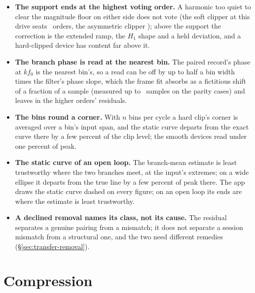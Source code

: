 \documentclass[11pt,a4paper]{article}
\begin{document}
{\begin{itemize}
  strips it, leaving levels of $\pm(a+b)/2$ --- equal magnitudes from an
  unequal circuit (Figure~\ref{fig:transfer-coupling}). The shape asymmetry
  remains, and the even harmonics in the paired swept analysis are where
  the asymmetry is read. Because every pedal has one, a transfer curve
  essentially never shows the raw asymmetry of an asymmetric clipper.
  \item \textbf{The support ends at the highest voting order.} A harmonic
  too quiet to clear the magnitude floor on either side does not vote
  (the soft clipper at this drive seats \tparityTanhVoted\ orders, the
  asymmetric clipper \tparityAsymVoted); above the support the correction is
  the extended ramp, the $H_1$ shape and a held deviation, and a hard-clipped
  device has content far above it.
  \item \textbf{The branch phase is read at the nearest bin.} The paired
  record's phase at $k f_0$ is the nearest bin's, so a read can be off by
  up to half a bin width times the filter's phase slope, which the frame fit
  absorbs as a fictitious shift of a fraction of a sample (measured up to
  \tparityWorstFrameShift\ samples on the parity cases) and leaves in the
  higher orders' residuals.
  \item \textbf{The bins round a corner.} With $n$ bins per cycle a hard
  clip's corner is averaged over a bin's input span, and the static curve
  departs from the exact curve there by a few percent of the clip level;
  the smooth devices read under one percent of peak.
  \item \textbf{The static curve of an open loop.} The branch-mean estimate
  is least trustworthy where the two branches meet, at the input's
  extremes; on a wide ellipse it departs from the true line by a few
  percent of peak there. The app draws the static curve dashed on every
  figure; on an open loop its ends are where the estimate is least
  trustworthy.
  \item \textbf{A declined removal names its class, not its cause.} The
  residual separates a genuine pairing from a mismatch; it does not separate
  a session mismatch from a structural one, and the two need different
  remedies (\S\ref{sec:transfer-removal}).
\end{itemize}
\par}

\clearpage
\section{Compression}
\label{sec:compression}

\end{document}
